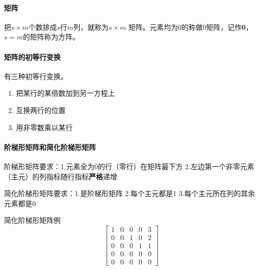 \documentclass[UTF8]{ctexart}
\begin{document}
\paragraph{矩阵}
把$s \times m$个数排成$s$行$m$列，就称为$s\times m$ 矩阵。元素均为0的称做0矩阵，记作\textbf{0}，$s=m$的矩阵称为方阵。

\paragraph{矩阵的初等行变换}有三种初等行变换。
\begin{enumerate}
	\item 把某行的某倍数加到另一方程上\\
	\item 互换两行的位置\\
	\item 用非零数乘以某行
\end{enumerate}

\paragraph{阶梯形矩阵和简化阶梯形矩阵}

阶梯形矩阵要求：1.元素全为$0$的行（零行）在矩阵最下方     2.左边第一个非零元素（主元）的列指标随行指标\textbf{严格}递增

简化阶梯形矩阵要求：1.是阶梯形矩阵    2.每个主元都是1   3.每个主元所在列的其余元素都是0

简化阶梯形矩阵例
$$\begin{bmatrix}
	1&0&0&0&3\\
	0&0&1&0&2\\
	0&0&0&1&1\\
	0&0&0&0&0\\
	0&0&0&0&0
\end{bmatrix}$$
\end{document}
